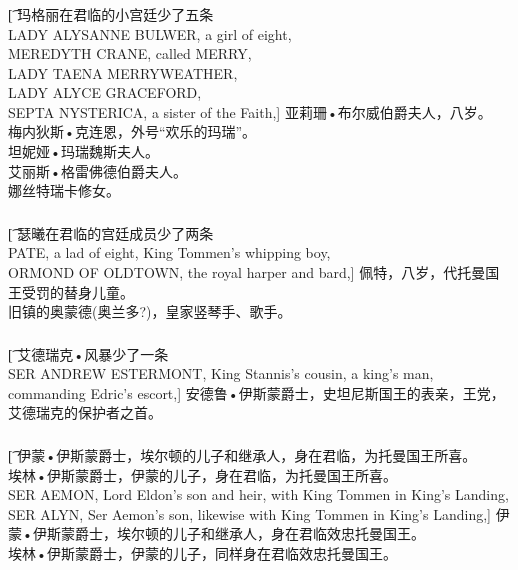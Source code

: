 \documentclass[12pt,a4paper]{article}
\begin{document}
\subsubsection{}\t[
	玛格丽在君临的小宫廷{\color{red}少了五条}\\
	LADY ALYSANNE BULWER, a girl of eight, \\
	MEREDYTH CRANE, called MERRY, \\
	LADY TAENA MERRYWEATHER, \\
	LADY ALYCE GRACEFORD, \\
	SEPTA NYSTERICA, a sister of the Faith,]
	{\large 亚莉珊•布尔威伯爵夫人}，八岁。\\
	{\large 梅内狄斯•克连恩}，外号“{\large 欢乐的玛瑞}”。\\
	{\large 坦妮娅•玛瑞魏斯夫人}。\\
	{\large 艾丽斯•格雷佛德伯爵夫人}。\\
	{\large 娜丝特瑞卡修女}。

\subsubsection{}\t[
	瑟曦在君临的宫廷成员{\color{red}少了两条}\\
	PATE, a lad of eight, King Tommen's whipping boy,\\
	ORMOND OF OLDTOWN, the royal harper and bard,]
	{\large 佩特}，八岁，代托曼国王受罚的替身儿童。\\
	{\large 旧镇的奥蒙德}(奥兰多?)，皇家竖琴手、歌手。
	
\subsubsection{}\t[
	艾德瑞克•风暴{\color{red}少了一条}\\
	SER ANDREW ESTERMONT, King Stannis's cousin, a king's man, commanding Edric's escort,]
	{\large 安德鲁•伊斯蒙爵士}，史坦尼斯国王的表亲，王党，艾德瑞克的保护者之首。
	
\subsubsection{}\t[
	{\large 伊蒙•伊斯蒙爵士}，埃尔顿的儿子和继承人，身在君临，为托曼国王所喜。\\
	{\large 埃林•伊斯蒙爵士}，伊蒙的儿子，身在君临，为托曼国王所喜。\\
	SER AEMON, Lord Eldon's son and heir, with King Tommen in King's Landing, \\
	SER ALYN, Ser Aemon's son, likewise with King Tommen in King's Landing,]
	{\large 伊蒙•伊斯蒙爵士}，埃尔顿的儿子和继承人，身在君临效忠托曼国王。\\
	{\large 埃林•伊斯蒙爵士}，伊蒙的儿子，同样身在君临效忠托曼国王。
	
\end{document}
